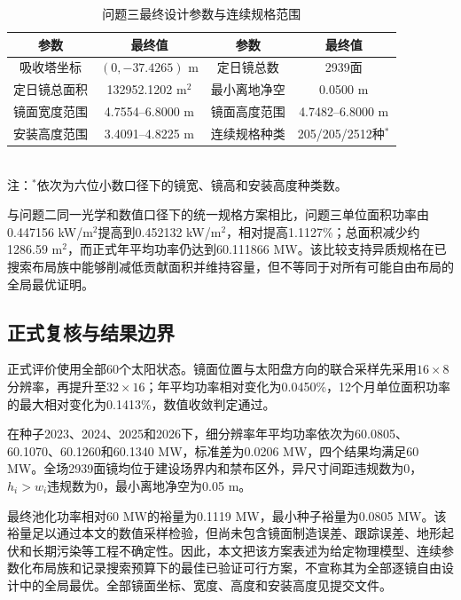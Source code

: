 \begin{table}[htbp]
  \centering
  \caption{问题三最终设计参数与连续规格范围}
  \label{tab:q3-design}
  \small
  \setlength{\tabcolsep}{6pt}
  \begin{tabular}{cccc}
    \toprule
    参数 & 最终值 & 参数 & 最终值 \\
    \midrule
    吸收塔坐标 & $(0,-37.4265)$ m & 定日镜总数 & 2939面 \\
    定日镜总面积 & 132952.1202 m$^2$ & 最小离地净空 & 0.0500 m \\
    镜面宽度范围 & 4.7554--6.8000 m & 镜面高度范围 & 4.7482--6.8000 m \\
    安装高度范围 & 3.4091--4.8225 m & 连续规格种类 & 205/205/2512种$^{*}$ \\
    \bottomrule
  \end{tabular}
  \\[2pt]
  \footnotesize 注：$^{*}$依次为六位小数口径下的镜宽、镜高和安装高度种类数。
\end{table}

与问题二同一光学和数值口径下的统一规格方案相比，问题三单位面积功率由0.447156 kW/m$^2$提高到0.452132 kW/m$^2$，相对提高1.1127\%；总面积减少约1286.59 m$^2$，而正式年平均功率仍达到60.111866 MW。该比较支持异质规格在已搜索布局族中能够削减低贡献面积并维持容量，但不等同于对所有可能自由布局的全局最优证明。

\subsection{正式复核与结果边界}

正式评价使用全部60个太阳状态。镜面位置与太阳盘方向的联合采样先采用$16\times8$分辨率，再提升至$32\times16$；年平均功率相对变化为0.0450\%，12个月单位面积功率的最大相对变化为0.1413\%，数值收敛判定通过。

在种子2023、2024、2025和2026下，细分辨率年平均功率依次为60.0805、60.1070、60.1260和60.1340 MW，标准差为0.0206 MW，四个结果均满足60 MW。全场2939面镜均位于建设场界内和禁布区外，异尺寸间距违规数为0，$h_i>w_i$违规数为0，最小离地净空为0.05 m。

最终池化功率相对60 MW的裕量为0.1119 MW，最小种子裕量为0.0805 MW。该裕量足以通过本文的数值采样检验，但尚未包含镜面制造误差、跟踪误差、地形起伏和长期污染等工程不确定性。因此，本文把该方案表述为给定物理模型、连续参数化布局族和记录搜索预算下的最佳已验证可行方案，不宣称其为全部逐镜自由设计中的全局最优。全部镜面坐标、宽度、高度和安装高度见提交文件。
